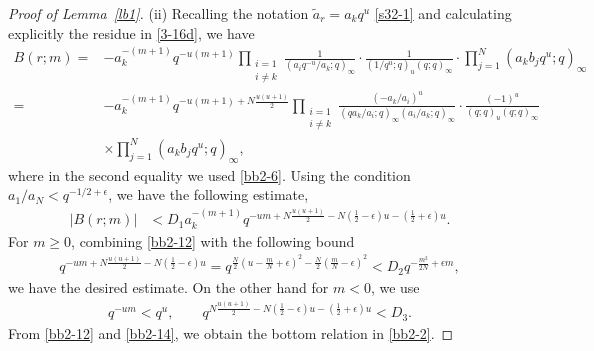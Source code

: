 \documentclass[11pt]{article}
\numberwithin{equation}{section}
\numberwithin{equation}{section}
\def\e{\epsilon}
\def\i{\infty}
\begin{document}
\begin{proof}[Proof of Lemma~\ref{lb1}]
 (ii)
 Recalling the notation $\tilde{a}_r=a_k q^{u}$ \eqref{s32-1} and calculating explicitly the residue in \eqref{3-16d}, we have
 \begin{align*}
 B(r;m)=&-a_k^{-(m+1)}q^{-u(m+1)}
 \prod_{\substack{i=1\\ i\neq k}}
 \frac{1}{(a_iq^{-u}/a_k ;q)_{\i}}\cdot
 \frac{1}{(1/q^u;q)_u (q;q)_{\i}}\cdot
 \prod_{j=1}^N(a_kb_jq^{u};q)_{\i}
 \\
 =&
 -a_k^{-(m+1)}q^{-u (m+1)+N\frac{u(u+1)}{2}}
 \prod_{\substack{i=1\\ i\neq k}}
 \frac{(-a_k/a_i)^u}{(q a_k/a_i;q)_{\i}(a_i/a_k;q)_\infty}\cdot
 \frac{(-1)^u}{(q;q)_u (q;q)_{\i}}
 \\
 &\times\prod_{j=1}^N(a_k b_jq^{u};q)_{\i},
 \end{align*}
 where in the second equality we used \eqref{bb2-6}.
 Using the condition $a_1/a_N< q^{-1/2+\e}$, we have the following estimate,
 \begin{align}
 \label{bb2-12}
 |B(r;m)|&<D_1 a_k^{-(m+1)} q^{-u m +N\frac{u(u+1)}{2}-N\left(\frac12-\e\right)u -\left(\frac12+\e\right)u}.
 \end{align}
 For $m\ge 0$, combining \eqref{bb2-12} with
 the following bound
 \begin{align*}
 q^{-u m+N\frac{u(u+1)}{2}-N\left(\frac12-\e\right)u}
 =
 q^{\frac{N}{2}\left(u-\frac{m}{N}+\e\right)^2-\frac{N}{2}\left(\frac{m}{N}-\e\right)^2}
 <D_2
 q^{-\frac{m^2}{2N}+\e m},
 \end{align*}
 we have the desired estimate. On the other hand
 for $m<0$, we use
 \begin{align}
 \label{bb2-14}
 q^{-u m}<q^{u},
 \qquad
 q^{N\frac{u(u+1)}{2}-N\left(\frac12-\e\right)u -\left(\frac12+\e\right)u}<D_3.
 \end{align}
 From \eqref{bb2-12} and \eqref{bb2-14}, we obtain
 the bottom relation in \eqref{bb2-2}.
\end{proof}
\end{document}
